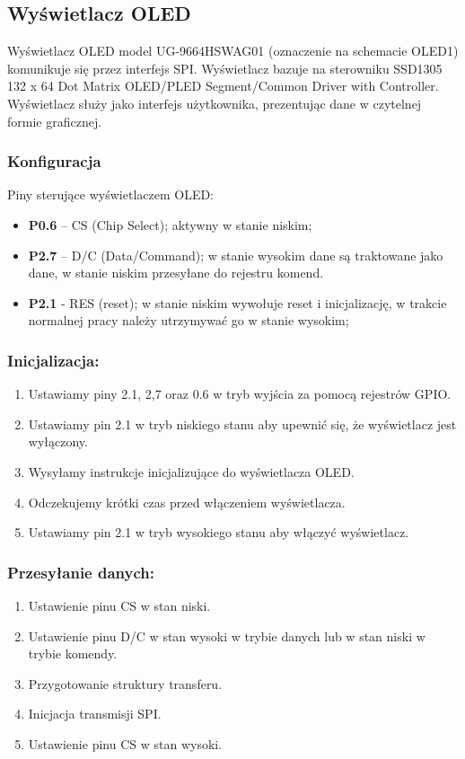 \subsection{Wyświetlacz OLED}

Wyświetlacz OLED model UG-9664HSWAG01 (oznaczenie na schemacie OLED1) komunikuje się przez interfejs SPI. Wyświetlacz bazuje na sterowniku SSD1305 132 x 64 Dot Matrix OLED/PLED Segment/Common Driver with Controller. Wyświetlacz służy jako interfejs użytkownika, prezentując dane w czytelnej formie graficznej.

\subsubsection{Konfiguracja}
Piny sterujące wyświetlaczem OLED:
\begin{itemize}
\item \textbf{P0.6} – CS (Chip Select); aktywny w stanie niskim;
\item \textbf{P2.7} – D/C (Data/Command); w stanie wysokim dane są traktowane jako dane, w stanie niskim przesyłane do rejestru komend.
\item \textbf{P2.1} - RES (reset); w stanie niskim wywołuje reset i inicjalizację, w trakcie normalnej pracy należy utrzymywać go w stanie wysokim;
\end{itemize}
\subsubsection {Inicjalizacja:}
\begin{enumerate}
    \item Ustawiamy piny 2.1, 2,7 oraz 0.6 w tryb wyjścia za pomocą rejestrów GPIO. %
    \item Ustawiamy pin 2.1 w tryb niskiego stanu aby upewnić się, że wyświetlacz jest wyłączony.
    \item Wysyłamy instrukcje inicjalizujące do wyświetlacza OLED.
    \item Odczekujemy krótki czas przed włączeniem wyświetlacza.
    \item Ustawiamy pin 2.1 w tryb wysokiego stanu aby włączyć wyświetlacz.
\end{enumerate}
\subsubsection {Przesyłanie danych:}
\label{przes}
\begin{enumerate}
    \item Ustawienie pinu CS w stan niski.
    \item Ustawienie pinu D/C w stan wysoki w trybie danych lub w stan niski w trybie komendy.
    \item Przygotowanie struktury transferu.
    \item Inicjacja transmisji SPI.
    \item Ustawienie pinu CS w stan wysoki.
\end{enumerate}

